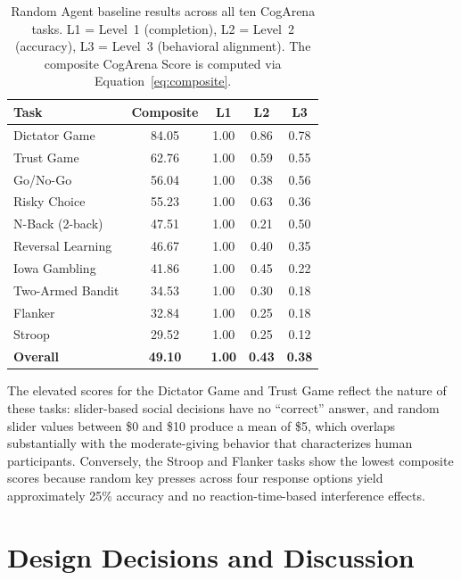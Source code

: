 \documentclass{article}
\begin{document}
\begin{table}[t]
\caption{Random Agent baseline results across all ten CogArena tasks. L1 = Level~1 (completion), L2 = Level~2 (accuracy), L3 = Level~3 (behavioral alignment). The composite CogArena Score is computed via Equation~\ref{eq:composite}.}
\label{tab:baseline}
\centering
\small
\begin{tabular}{@{}lcccc@{}}
\toprule
\textbf{Task} & \textbf{Composite} & \textbf{L1} & \textbf{L2} & \textbf{L3} \\
\midrule
Dictator Game      & 84.05 & 1.00 & 0.86 & 0.78 \\
Trust Game         & 62.76 & 1.00 & 0.59 & 0.55 \\
Go/No-Go           & 56.04 & 1.00 & 0.38 & 0.56 \\
Risky Choice       & 55.23 & 1.00 & 0.63 & 0.36 \\
N-Back (2-back)    & 47.51 & 1.00 & 0.21 & 0.50 \\
Reversal Learning  & 46.67 & 1.00 & 0.40 & 0.35 \\
Iowa Gambling      & 41.86 & 1.00 & 0.45 & 0.22 \\
Two-Armed Bandit   & 34.53 & 1.00 & 0.30 & 0.18 \\
Flanker            & 32.84 & 1.00 & 0.25 & 0.18 \\
Stroop             & 29.52 & 1.00 & 0.25 & 0.12 \\
\midrule
\textbf{Overall}   & \textbf{49.10} & \textbf{1.00} & \textbf{0.43} & \textbf{0.38} \\
\bottomrule
\end{tabular}
\end{table}

The elevated scores for the Dictator Game and Trust Game reflect the nature of these tasks: slider-based social decisions have no ``correct'' answer, and random slider values between \$0 and \$10 produce a mean of \$5, which overlaps substantially with the moderate-giving behavior that characterizes human participants. Conversely, the Stroop and Flanker tasks show the lowest composite scores because random key presses across four response options yield approximately 25\% accuracy and no reaction-time-based interference effects.

\section{Design Decisions and Discussion}
\label{sec:discussion}
\end{document}
